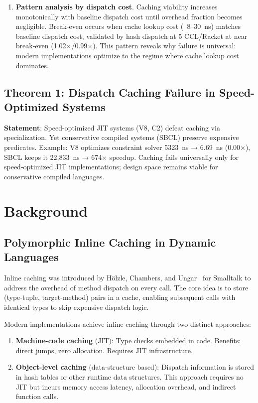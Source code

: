 \documentclass[sigplan,final,acmsmall,review,screen]{acmart}
\begin{document}
\begin{enumerate}
  \item \textbf{Pattern analysis by dispatch cost}. Caching viability increases monotonically with baseline dispatch cost until overhead fraction becomes
    negligible. Break-even occurs when cache lookup cost (~8--30~ns) matches baseline dispatch cost, validated by hash dispatch at 5%
    CCL/Racket at near break-even (1.02×/0.99×). This pattern reveals why failure is universal: modern implementations optimize to the regime
    where cache lookup cost dominates.
\end{enumerate}

\subsection{Theorem 1: Dispatch Caching Failure in Speed-Optimized Systems}

\textbf{Statement}: Speed-optimized JIT systems (V8, C2) defeat caching via specialization. Yet conservative compiled systems (SBCL) preserve expensive predicates. Example: V8 optimizes constraint solver 5323~ns → 6.69~ns (0.00×), SBCL keeps it 22,833~ns → 674× speedup. Caching fails universally only for speed-optimized JIT implementations; design space remains viable for conservative compiled languages.

\section{Background}

\subsection{Polymorphic Inline Caching in Dynamic Languages}

Inline caching was introduced by Hölzle, Chambers, and Ungar~\cite{hoelzle1991optimizing}
for Smalltalk to address the overhead of method dispatch on every call. The core idea is to
store (type-tuple, target-method) pairs in a cache, enabling subsequent calls with identical
types to skip expensive dispatch logic.

Modern implementations achieve inline caching through two distinct approaches:

\begin{enumerate}
  \item \textbf{Machine-code caching} (JIT): Type checks embedded in code. Benefits: direct
    jumps, zero allocation. Requires JIT infrastructure.

  \item \textbf{Object-level caching} (data-structure based): Dispatch information is stored
    in hash tables or other runtime data structures. This approach requires no JIT but incurs
    memory access latency, allocation overhead, and indirect function calls.
\end{enumerate}
\end{document}
